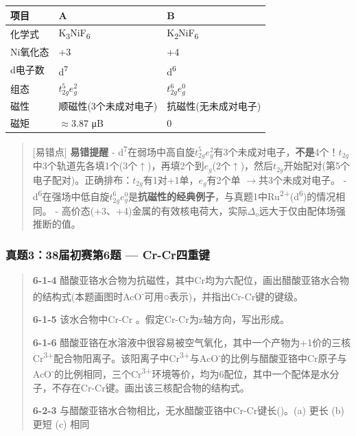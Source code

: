 \documentclass[a4paper,11pt]{ctexart}
\newcounter{none}
\newcommand{\箭}{\ensuremath{\rightarrow}}
\newcommand{\左箭}{\ensuremath{\leftarrow}}
\newcommand{\上箭}{\ensuremath{\uparrow}}
\newcommand{\下箭}{\ensuremath{\downarrow}}
\newcommand{\衡}{\ensuremath{\rightleftharpoons}}
\newcommand{\双箭}{\ensuremath{\leftrightarrow}}
\newcommand{\约等于}{\ensuremath{\approx}}
\newcommand{\小于等于}{\ensuremath{\leq}}
\newcommand{\大于等于}{\ensuremath{\geq}}
\newcommand{\不等于}{\ensuremath{\neq}}
\newcommand{\西格马}{\ensuremath{\sigma}}
\newcommand{\派}{\ensuremath{\pi}}
\begin{document}
{\def\LTcaptype{none} %
\begin{longtable}[]{@{}lll@{}}
\toprule\noalign{}
项目 & A & B \\
\midrule\noalign{}
\endhead
\bottomrule\noalign{}
\endlastfoot
化学式 & K\textsubscript{3}NiF\textsubscript{6} & K\textsubscript{2}NiF\textsubscript{6} \\
Ni氧化态 & +3 & +4 \\
d电子数 & d\textsuperscript{7} & d\textsuperscript{6} \\
组态 & \(t_{2g}^{5}e_{g}^{2}\) & \(t_{2g}^{6}e_{g}^{0}\) \\
磁性 & 顺磁性(3个未成对电子) & 抗磁性(无未成对电子) \\
磁矩 & \约等于 3.87 μB & 0 \\
\end{longtable}
}

\begin{quote}
{[}易错点{]} \textbf{易错提醒}
- d\textsuperscript{7}在弱场中高自旋\(t_{2g}^{5}e_{g}^{2}\)有3个未成对电子，\textbf{不是}4个！\(t_{2g}\)中3个轨道先各填1个(3个\上箭)，再填2个到\(e_g\)(2个\上箭)，然后\(t_{2g}\)开始配对(第5个电子配对)。正确排布：\(t_{2g}\)有1对+1单，\(e_g\)有2个单 \箭 共3个未成对电子。
- d\textsuperscript{6}在强场中低自旋\(t_{2g}^{6}e_{g}^{0}\)是\textbf{抗磁性的经典例子}，与真题1中Ru\textsuperscript{2+}(d\textsuperscript{6})的情况相同。
- 高价态(+3、+4)金属的有效核电荷大，实际\(\Delta_o\)远大于仅由配体场强推断的值。
\end{quote}

\subsubsection{真题3：38届初赛第6题 --- Cr-Cr四重键}\label{ux771fux9898338ux5c4aux521dux8d5bux7b2c6ux9898-cr-crux56dbux91cdux952e}

\begin{quote}
\textbf{6-1-4} 醋酸亚铬水合物为抗磁性，其中Cr均为六配位，画出醋酸亚铬水合物的结构式(本题画图时AcO\textsuperscript{-}可用○表示)，并指出Cr-Cr键的键级。

\textbf{6-1-5} 该水合物中Cr-Cr 。假定Cr-Cr为z轴方向，写出形成。

\textbf{6-1-6} 醋酸亚铬在水溶液中很容易被空气氧化，其中一个产物为+1价的三核Cr\textsuperscript{3+}配合物阳离子。该阳离子中Cr\textsuperscript{3+}与AcO\textsuperscript{-}的比例与醋酸亚铬中Cr原子与AcO\textsuperscript{-}的比例相同，三个Cr\textsuperscript{3+}环境等价，均为6配位，其中一个配体是水分子，不存在Cr-Cr键。画出该三核配合物的结构式。

\textbf{6-2-3} 与醋酸亚铬水合物相比，无水醋酸亚铬中Cr-Cr键长()。(a) 更长 (b) 更短 (c) 相同
\end{quote}
\end{document}
